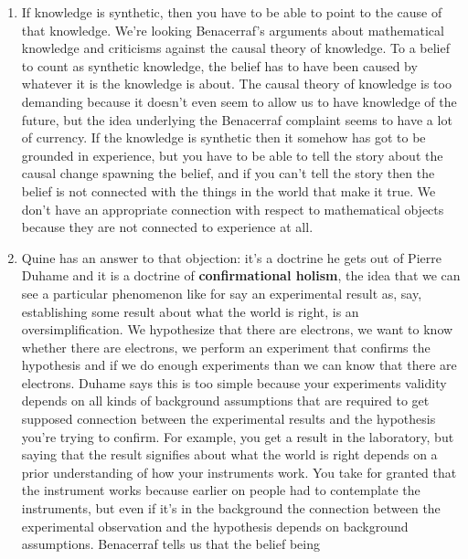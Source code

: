 \documentclass[12pt]{article}
\theoremstyle{definition}
\begin{document}
\begin{enumerate}
    \itemsep0em 
    \item
        If knowledge is synthetic, then you have to be able to point to the
        cause of that knowledge. We're looking Benacerraf's arguments about
        mathematical knowledge and criticisms against the causal theory of
        knowledge. To a belief to count as synthetic knowledge, the belief has
        to have been caused by whatever it is the knowledge is about. The
        causal theory of knowledge is too demanding because it doesn't even
        seem to allow us to have knowledge of the future, but the idea
        underlying the Benacerraf complaint seems to have a lot of currency. If
        the knowledge is synthetic then it somehow has got to be grounded in
        experience, but you have to be able to tell the story about the causal
        change spawning the belief, and if you can't tell the story then the
        belief is not connected with the things in the world that make it true.
        We don't have an appropriate connection with respect to mathematical
        objects because they are not connected to experience at all. 
    \item
        Quine has an answer to that objection: it's a doctrine he gets out of
        Pierre Duhame and it is a doctrine of \textbf{confirmational holism},
        the idea that we can see a particular phenomenon like for say an
        experimental result as, say, establishing some result about what the
        world is right, is an oversimplification. We hypothesize that there are
        electrons, we want to know whether there are electrons, we perform an
        experiment that confirms the hypothesis and if we do enough experiments
        than we can know that there are electrons. Duhame says this is too
        simple because your experiments validity depends on all kinds of
        background assumptions that are required to get supposed connection
        between the experimental results and the hypothesis you're trying to
        confirm. For example, you get a result in the laboratory, but saying
        that the result signifies about what the world is right depends on a
        prior understanding of how your instruments work. You take for granted
        that the instrument works because earlier on people had to contemplate
        the instruments, but even if it's in the background the connection
        between the experimental observation and the hypothesis depends on
        background assumptions. Benacerraf tells us that the belief being

\end{enumerate}
\end{document}
